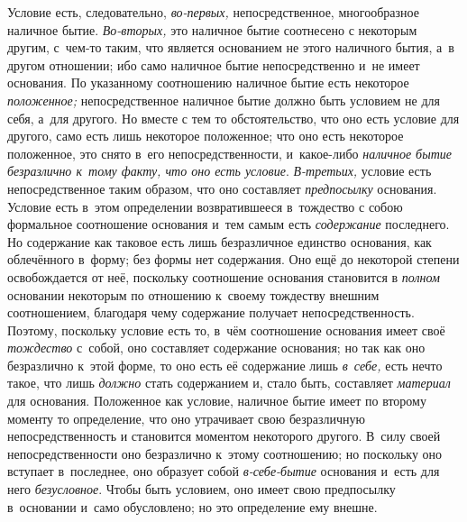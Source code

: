 Условие есть, следовательно, {\em во-первых,}
непосредственное, многообразное наличное бытие.
{\em Во-вторых,} это наличное бытие соотнесено с
некоторым другим, с~чем-то таким, что является основанием не этого
наличного бытия, а~в другом отношении; ибо само наличное бытие
непосредственно и~не имеет основания. По указанному соотношению наличное
бытие есть некоторое {\em положенное;} непосредственное
наличное бытие должно быть условием не для себя, а~для другого. Но вместе с
тем то обстоятельство, что оно есть условие для другого, само есть лишь
некоторое положенное; что оно есть некоторое положенное, это снято в~его
непосредственности, и~какое-либо {\em наличное бытие
безразлично к~тому факту, что оно есть условие}.
{\em В-третьих,} условие есть непосредственное таким
образом, что оно составляет {\em предпосылку}
основания. Условие есть в~этом определении возвратившееся в~тождество с
собою формальное соотношение основания и~тем самым есть
{\em содержание} последнего. Но содержание как таковое
есть лишь безразличное единство основания, как облечённого в~форму; без
формы нет содержания. Оно ещё до некоторой степени освобождается от неё,
поскольку соотношение основания становится в
{\em полном} основании некоторым по отношению к~своему
тождеству внешним соотношением, благодаря чему содержание получает
непосредственность. Поэтому, поскольку условие есть то, в~чём соотношение
основания имеет своё {\em тождество} с~собой, оно
составляет содержание основания; но так как оно безразлично к~этой форме,
то оно есть её содержание лишь {\em в~себе,} есть нечто
такое, что лишь {\em должно} стать содержанием и, стало
быть, составляет {\em материал} для основания.
Положенное как условие, наличное бытие имеет по второму моменту то
определение, что оно утрачивает свою безразличную непосредственность и
становится моментом некоторого другого. В~силу своей непосредственности оно
безразлично к~этому соотношению; но поскольку оно вступает в~последнее, оно
образует собой {\em в-себе-бытие} основания и~есть для
него {\em безусловное}. Чтобы быть условием, оно имеет
свою предпосылку в~основании и~само обусловлено; но это определение ему внешне.

